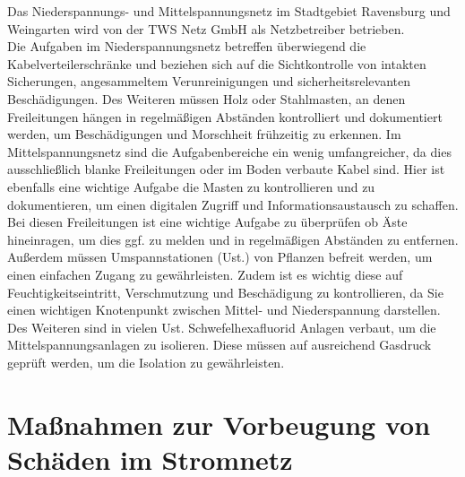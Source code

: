 Das Niederspannungs- und Mittelspannungsnetz im Stadtgebiet Ravensburg und Weingarten wird von der TWS Netz GmbH als Netzbetreiber betrieben. \autocite{Schwab.2012} 
\\
Die Aufgaben im Niederspannungsnetz betreffen überwiegend die Kabelverteilerschränke und beziehen sich auf die Sichtkontrolle von intakten Sicherungen, 
angesammeltem Verunreinigungen und sicherheitsrelevanten Beschädigungen. Des Weiteren müssen Holz oder Stahlmasten, an denen Freileitungen hängen in 
regelmäßigen Abständen kontrolliert und dokumentiert werden, um Beschädigungen und Morschheit frühzeitig zu erkennen. Im Mittelspannungsnetz sind die 
Aufgabenbereiche ein wenig umfangreicher, da dies ausschließlich blanke Freileitungen oder im Boden verbaute Kabel sind. Hier ist ebenfalls eine wichtige 
Aufgabe die Masten zu kontrollieren und zu dokumentieren, um einen digitalen Zugriff und Informationsaustausch zu schaffen. Bei diesen Freileitungen ist 
eine wichtige Aufgabe zu überprüfen ob Äste hineinragen, um dies ggf. zu melden und in regelmäßigen Abständen zu entfernen. Außerdem müssen Umspannstationen 
(Ust.) von Pflanzen befreit werden, um einen einfachen Zugang zu gewährleisten. Zudem ist es wichtig diese auf Feuchtigkeitseintritt, Verschmutzung und 
Beschädigung zu kontrollieren, da Sie einen wichtigen Knotenpunkt zwischen Mittel- und Niederspannung darstellen. Des Weiteren sind in vielen Ust. 
Schwefelhexafluorid  Anlagen verbaut, um die Mittelspannungsanlagen zu isolieren. Diese müssen auf ausreichend Gasdruck geprüft werden, um die 
Isolation zu gewährleisten.
\clearpage

\section{Maßnahmen zur Vorbeugung von Schäden im Stromnetz}

